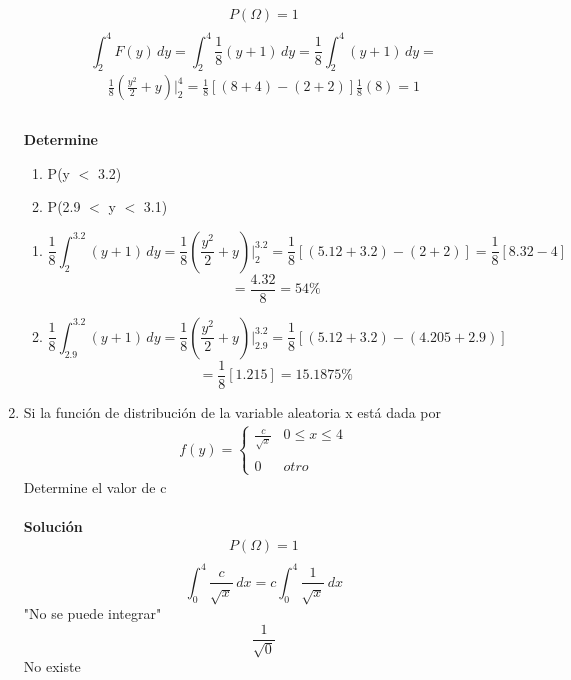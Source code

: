 \begin{enumerate}
\begin{gather*}
    P(\Omega)=1\\ 
    \end{gather*}
    \[ \int_{2}^{4}  \! F(y) \, dy =
    \int_{2}^{4}  \! \frac{1}{8}(y+1) \, dy =\frac{1}{8}\int_{2}^{4}  \! (y+1) \, dy = 
    \]
    \begin{gather*}
    \frac{1}{8}(\frac{y^2}{2}+y)|_2^4 =
    \frac{1}{8}[(8+4)-(2+2)]\frac{1}{8}(8)=1 \\
    \end{gather*}
    \\\textbf{Determine}\\
    \begin{enumerate}
        \item P(y $<$ 3.2)\\
        \item P(2.9 $<$ y $<$ 3.1)
    \end{enumerate}
    \begin{enumerate}
        \item  \[\frac{1}{8}\int_{2}^{3.2}  \! (y+1) \, dy =\frac{1}{8}(\frac{y^2}{2}+y)|_2^3.2 = \frac{1}{8}[(5.12+3.2)-(2+2)]=\frac{1}{8}[8.32-4]
        \]
        \[=\frac{4.32}{8}=54\% 
        \]
        \item \[\frac{1}{8}\int_{2.9}^{3.2}  \! (y+1) \, dy =\frac{1}{8}(\frac{y^2}{2}+y)|_2.9^3.2 = \frac{1}{8}[(5.12+3.2)-(4.205+2.9)]
        \]
        \[=\frac{1}{8}[1.215]=15.1875\% 
        \]
    \end{enumerate}
    \item Si la función de distribución de la variable aleatoria x está dada por
    \begin{gather*}
    f(y)= \left\{ \begin{array}{lcc}
    \frac{c}{\sqrt{x}} & 0 \leq x \leq 4\\
    \\ 0 & otro 
    \end{array}
    \right.
    \end{gather*}
    Determine el valor de c\\
    \\\textbf{Solución}
    \\
    \begin{gather*}
    P(\Omega)=1\\ 
    \end{gather*}
    \[ \int_{0}^{4}  \! \frac{c}{\sqrt{x}} \, dx =
    c\int_{0}^{4}  \! \frac{1}{\sqrt{x}} \, dx 
    \]
    "No se puede integrar"
    \[ \frac{1}{\sqrt{0}}
    \] No existe

\end{enumerate}
